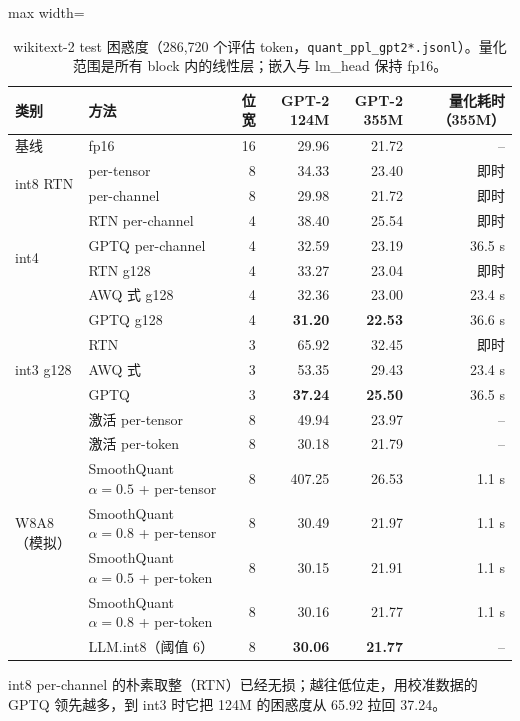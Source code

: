 \documentclass[11pt,a4paper]{ctexart}
\begin{document}
\begin{table}[H]
\centering\small
\begin{adjustbox}{max width=\linewidth}\begin{tabular}{llrrrr}
\toprule
类别 & 方法 & 位宽 & GPT-2 124M & GPT-2 355M & 量化耗时（355M） \\
\midrule
基线 & fp16 & 16 & 29.96 & 21.72 & -- \\
\midrule
\multirow{2}{*}{int8 RTN} & per-tensor & 8 & 34.33 & 23.40 & 即时 \\
 & per-channel & 8 & 29.98 & 21.72 & 即时 \\
\midrule
\multirow{4}{*}{int4} & RTN per-channel & 4 & 38.40 & 25.54 & 即时 \\
 & GPTQ per-channel & 4 & 32.59 & 23.19 & 36.5 s \\
 & RTN g128 & 4 & 33.27 & 23.04 & 即时 \\
 & AWQ 式 g128 & 4 & 32.36 & 23.00 & 23.4 s \\
 & GPTQ g128 & 4 & \textbf{31.20} & \textbf{22.53} & 36.6 s \\
\midrule
\multirow{3}{*}{int3 g128} & RTN & 3 & 65.92 & 32.45 & 即时 \\
 & AWQ 式 & 3 & 53.35 & 29.43 & 23.4 s \\
 & GPTQ & 3 & \textbf{37.24} & \textbf{25.50} & 36.5 s \\
\midrule
\multirow{7}{*}{W8A8（模拟）} & 激活 per-tensor & 8 & 49.94 & 23.97 & -- \\
 & 激活 per-token & 8 & 30.18 & 21.79 & -- \\
 & SmoothQuant $\alpha{=}0.5$ + per-tensor & 8 & 407.25 & 26.53 & 1.1 s \\
 & SmoothQuant $\alpha{=}0.8$ + per-tensor & 8 & 30.49 & 21.97 & 1.1 s \\
 & SmoothQuant $\alpha{=}0.5$ + per-token & 8 & 30.15 & 21.91 & 1.1 s \\
 & SmoothQuant $\alpha{=}0.8$ + per-token & 8 & 30.16 & 21.77 & 1.1 s \\
 & LLM.int8（阈值 6） & 8 & \textbf{30.06} & \textbf{21.77} & -- \\
\bottomrule
\end{tabular}\end{adjustbox}
\caption{wikitext-2 test 困惑度（286,720 个评估 token，\texttt{quant\_ppl\_gpt2*.jsonl}）。量化范围是所有 block 内的线性层；嵌入与 lm\_head 保持 fp16。}
\label{tab:ppl}
\end{table}

\begin{findingbox}
int8 per-channel 的朴素取整（RTN）已经无损；越往低位走，用校准数据的 GPTQ 领先越多，到 int3 时它把 124M 的困惑度从 65.92 拉回 37.24。
\end{findingbox}
\end{document}
